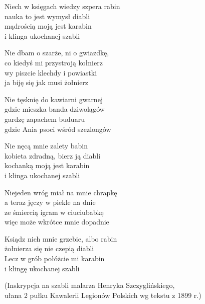 \begin{text}
    Niech w księgach wiedzy szpera rabin\\
    nauka to jest wymysł diabli\\
    mądrością moją jest karabin\\
    i klinga ukochanej szabli

    Nie dbam o szarże, ni o gwiazdkę,\\
    co kiedyś mi przystroją kołnierz\\
    wy piszcie klechdy i powiastki\\
    ja biję się jak musi żołnierz

    Nie tęsknię do kawiarni gwarnej\\
    gdzie mieszka banda dziwolągów\\
    gardzę zapachem buduaru\\
    gdzie Ania psoci wśród szezlongów

    Nie nęcą mnie zalety babin\\
    kobieta zdradną, bierz ją diabli\\
    kochanką moją jest karabin\\
    i klinga ukochanej szabli

    Niejeden wróg miał na mnie chrapkę\\
    a teraz jęczy w piekle na dnie\\
    ze śmiercią igram w ciuciubabkę\\
    więc może wkrótce mnie dopadnie

    Ksiądz nich mnie grzebie, albo rabin\\
    żołnierza się nie czepią diabli\\
    Lecz w grób połóżcie mi karabin\\
    i klingę ukochanej szabli

    (Inskrypcja na szabli malarza Henryka Szczyglińskiego,\\
    ułana 2 pułku Kawalerii Legionów Polskich wg tekstu  z 1899 r.)

\end{text}
\begin{chord}

\end{chord}